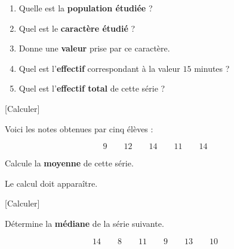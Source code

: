 \documentclass[12pt,a4paper]{article}
\begin{document}
\begin{enumerate}

  \item Quelle est la \textbf{population étudiée} ? 


  \item Quel est le \textbf{caractère étudié} ? 


  \item Donne une \textbf{valeur} prise par ce caractère. 


  \item Quel est l'\textbf{effectif} correspondant à la valeur
  \(15\) minutes ? 


  \item Quel est l'\textbf{effectif total} de cette série ? 


\end{enumerate}


\newpage


[Calculer]

Voici les notes obtenues par cinq élèves :

\[
9\qquad
12\qquad
14\qquad
11\qquad
14
\]

Calcule la \textbf{moyenne} de cette série.

Le calcul doit apparaître. 


\vspace{1em}


[Calculer]

Détermine la \textbf{médiane} de la série suivante. 

\[
14\qquad
8\qquad
11\qquad
9\qquad
13\qquad
10
\]

\end{document}
